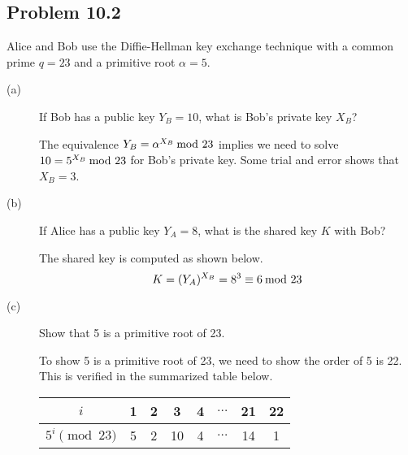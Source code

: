 \documentclass[../hw_sols.tex]{subfiles}
\begin{document}

\subsection*{Problem 10.2}

Alice and Bob use the Diffie-Hellman key exchange technique with a common 
prime $q = 23$ and a primitive root $\alpha = 5$.

\begin{description}

\item[(a)] If Bob has a public key $Y_B = 10$, what is Bob's private key $X_B$?

\begin{solution}
The equivalence $Y_B = \alpha^{X_B} \tmod{23}$ implies we need to solve 
$10 = 5^{X_B} \tmod{23}$ for Bob's private key. Some trial and error shows 
that $X_B = 3$.
\end{solution}

\item[(b)] If Alice has a public key $Y_A = 8$, what is the shared key $K$ 
with Bob?

\begin{solution}
The shared key is computed as shown below.
	\[ K = (Y_A)^{X_B} = 8^3 \equiv 6 \tmod{23} \]
\end{solution}

\item[(c)] Show that 5 is a primitive root of 23.

\begin{solution}
To show 5 is a primitive root of 23, we need to show the order of 5 is 22. 
This is verified in the summarized table below.
\begin{center}
\begin{tabular}{ c | *{7}{c} }
	$i$ & 1 & 2 & 3 & 4 & $\dots$ & 21 & 22 \\
	\hline
	$5^i \pmod{23}$ & 5 & 2 & 10 & 4 & $\dots$ & 14 & 1
\end{tabular}
\end{center}
\end{solution}

\end{description}
\end{document}

